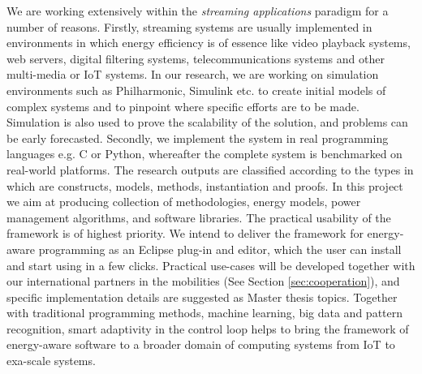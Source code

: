 \documentclass{article}
\begin{document}
We are working extensively within the \textit{streaming applications} paradigm for a number of reasons. 
Firstly, streaming systems are usually implemented in environments in which energy efficiency is of essence like video playback systems, web servers, digital filtering systems, telecommunications systems and other multi-media or IoT systems.
In our research, we are working on simulation environments such as Philharmonic, Simulink etc. to create initial models of complex systems and to pinpoint where specific efforts are to be made.
Simulation is also used to prove the scalability of the solution, and problems can be early forecasted.
Secondly, we implement the system in real programming languages e.g. C or Python, whereafter the complete system is benchmarked on real-world platforms.
The research outputs are classified according to the types in \cite{Jarvinen:01} which are constructs, models, methods, instantiation and proofs.
In this project we aim at producing collection of methodologies, energy models, power management algorithms, and software libraries.
The practical usability of the framework is of highest priority.
We intend to deliver the framework for energy-aware programming as an Eclipse plug-in and editor, which the user can install and start using in a few clicks.
Practical use-cases will be developed together with our international partners in the mobilities (See Section \ref{sec:cooperation}), and specific implementation details are suggested as Master thesis topics.
Together with traditional programming methods, machine learning, big data and pattern recognition, smart adaptivity in the control loop helps to bring the framework of energy-aware software to a broader domain of computing systems from IoT to exa-scale systems.
\end{document}
